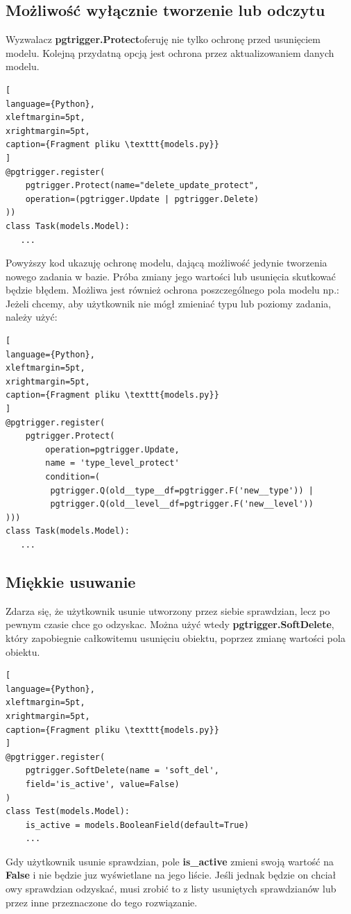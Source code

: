 \documentclass[oneside,polski,logo,indent]{amuthesis}
\begin{document}
\begin{enumerate}
\begin{enumerate}
\subsection{Możliwość wyłącznie tworzenie lub odczytu}
Wyzwalacz \textbf{pgtrigger.Protect}oferuję nie tylko ochronę przed usunięciem modelu. Kolejną przydatną opcją jest ochrona przez aktualizowaniem danych modelu.
\begin{lstlisting}[
language={Python},
xleftmargin=5pt,
xrightmargin=5pt,
caption={Fragment pliku \texttt{models.py}}
]
@pgtrigger.register(
    pgtrigger.Protect(name="delete_update_protect",
	operation=(pgtrigger.Update | pgtrigger.Delete)
))
class Task(models.Model):
   ...
\end{lstlisting}
Powyższy kod ukazuję ochronę modelu, dającą możliwość jedynie tworzenia nowego zadania w bazie. Próba zmiany jego wartości lub usunięcia skutkować będzie błędem. Możliwa jest również ochrona poszczególnego pola modelu np.:
Jeżeli chcemy, aby użytkownik nie mógł zmieniać typu lub poziomy zadania, należy użyć:

\begin{lstlisting}[
language={Python},
xleftmargin=5pt,
xrightmargin=5pt,
caption={Fragment pliku \texttt{models.py}}
]
@pgtrigger.register(
    pgtrigger.Protect(
        operation=pgtrigger.Update,
        name = 'type_level_protect'
        condition=(
         pgtrigger.Q(old__type__df=pgtrigger.F('new__type')) |
         pgtrigger.Q(old__level__df=pgtrigger.F('new__level'))
)))
class Task(models.Model):
   ...
\end{lstlisting}
\subsection{Miękkie usuwanie}
Zdarza się, że użytkownik usunie utworzony przez siebie sprawdzian, lecz po pewnym czasie chce go odzyskac. Można użyć wtedy \textbf{pgtrigger.SoftDelete}, który zapobiegnie całkowitemu usunięciu obiektu, poprzez zmianę wartości pola obiektu.
\begin{lstlisting}[
language={Python},
xleftmargin=5pt,
xrightmargin=5pt,
caption={Fragment pliku \texttt{models.py}}
]
@pgtrigger.register(
    pgtrigger.SoftDelete(name = 'soft_del',
	field='is_active', value=False)
)
class Test(models.Model):
    is_active = models.BooleanField(default=True)
    ... 
\end{lstlisting}
Gdy użytkownik usunie sprawdzian, pole \textbf{is\_active} zmieni swoją wartość na \textbf{False} i nie będzie juz wyświetlane na jego liście. Jeśli jednak będzie on chciał owy sprawdzian odzyskać, musi zrobić to z listy usuniętych sprawdzianów lub przez inne przeznaczone do tego rozwiązanie.

\end{enumerate}
\end{enumerate}
\end{document}

